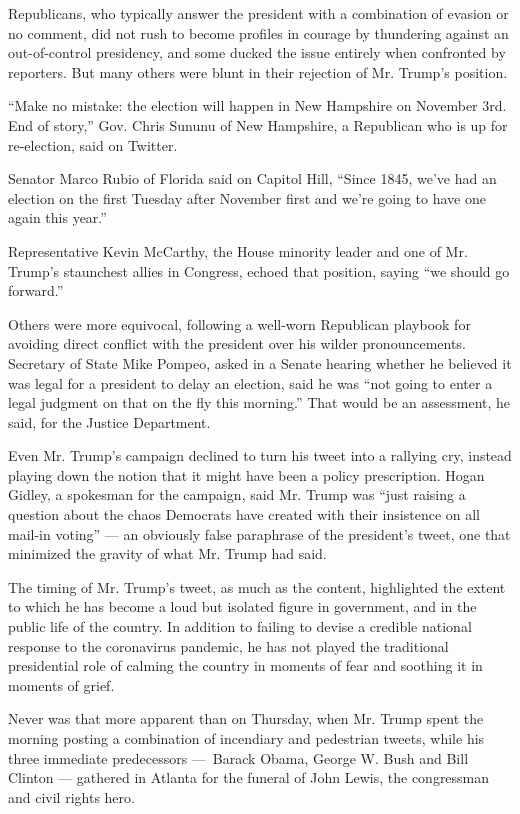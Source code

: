 Republicans, who typically answer the president with a combination of
evasion or no comment, did not rush to become profiles in courage by
thundering against an out-of-control presidency, and some ducked the
issue entirely when confronted by reporters. But many others were blunt
in their rejection of Mr. Trump's position.

``Make no mistake: the election will happen in New Hampshire on November
3rd. End of story,'' Gov. Chris Sununu of New Hampshire, a Republican
who is up for re-election, said on Twitter.

Senator Marco Rubio of Florida said on Capitol Hill, ``Since 1845, we've
had an election on the first Tuesday after November first and we're
going to have one again this year.''

Representative Kevin McCarthy, the House minority leader and one of Mr.
Trump's staunchest allies in Congress, echoed that position, saying ``we
should go forward.''

Others were more equivocal, following a well-worn Republican playbook
for avoiding direct conflict with the president over his wilder
pronouncements. Secretary of State Mike Pompeo, asked in a Senate
hearing whether he believed it was legal for a president to delay an
election, said he was ``not going to enter a legal judgment on that on
the fly this morning.'' That would be an assessment, he said, for the
Justice Department.

Even Mr. Trump's campaign declined to turn his tweet into a rallying
cry, instead playing down the notion that it might have been a policy
prescription. Hogan Gidley, a spokesman for the campaign, said Mr. Trump
was ``just raising a question about the chaos Democrats have created
with their insistence on all mail-in voting'' --- an obviously false
paraphrase of the president's tweet, one that minimized the gravity of
what Mr. Trump had said.

The timing of Mr. Trump's tweet, as much as the content, highlighted the
extent to which he has become a loud but isolated figure in government,
and in the public life of the country. In addition to failing to devise
a credible national response to the coronavirus pandemic, he has not
played the traditional presidential role of calming the country in
moments of fear and soothing it in moments of grief.

Never was that more apparent than on Thursday, when Mr. Trump spent the
morning posting a combination of incendiary and pedestrian tweets, while
his three immediate predecessors ---~Barack Obama, George W. Bush and
Bill Clinton --- gathered in Atlanta for the funeral of John Lewis, the
congressman and civil rights hero.

